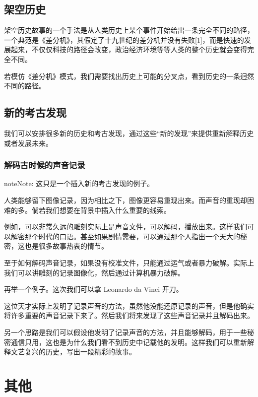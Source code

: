 \documentclass[letterpaper,10pt,english]{sphinxmanual}
\begin{document}
\subsection{架空历史}
\label{history:id4}
架空历史故事的一个手法是从人类历史上某个事件开始给出一条完全不同的路径，一个典范是《差分机》，其假定了十九世纪的差分机并没有失败{[}1{]}，而是快速的发展起来，不仅仅科技的路径会改变，政治经济环境等等人类的整个历史就会变得完全不同。

若模仿《差分机》模式，我们需要找出历史上可能的分叉点，看到历史的一条迥然不同的路径。


\subsection{新的考古发现}
\label{history:id7}
我们可以安排很多新的历史和考古发现，通过这些“新的发现”来提供重新解释历史或者发展未来。


\subsubsection{解码古时候的声音记录}
\label{history:id8}
\begin{notice}{note}{Note:}
这只是一个插入新的考古发现的例子。
\end{notice}

人类能够留下图像记录，因为相比之下，图像更容易重现出来。而声音的重现却困难的多。倘若我们想要在背景中插入什么重要的线索。

例如，可以非常久远的雕刻实际上是声音文件，可以解码，播放出来。这样我们可以解密那个时代的口语。甚至如果剧情需要，可以通过那个人指出一个天大的秘密，这也是很多故事热衷的情节。

至于如何解码声音记录，如果没有校准文件，只能通过运气或者暴力破解。实际上我们可以讲雕刻的记录图像化，然后通过计算机暴力破解。

再举一个例子。这次我们可以拿 Leonardo da Vinci 开刀。

这位天才实际上发明了记录声音的方法，虽然他没能还原记录的声音，但是他确实将许多重要的声音记录下来了。然后我们将来发现了这些声音记录并且解码出来。

另一个思路是我们可以假设他发明了记录声音的方法，并且能够解码，用于一些秘密通信只用，这也是为什么我们看不到历史中记载他的发明。这样我们可以重新解释文艺复兴的历史，写出一段精彩的故事。


\section{其他}
\label{misc::doc}\label{misc:id1}
\end{document}

